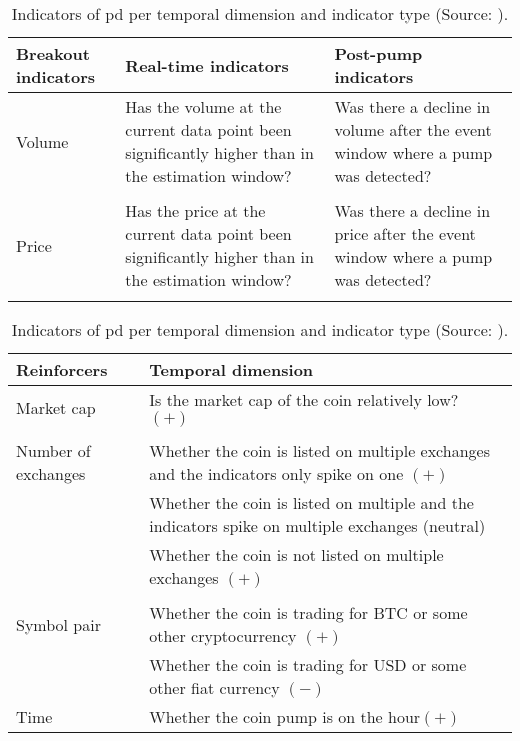 \begin{table}
    \centering
    \begin{tabular}{p{} p{} p{}}
    \hline
    \textbf{Breakout indicators} &\textbf{Real-time indicators} & \textbf{Post-pump indicators}\\
    \hline
    Volume & Has the volume at the current data point been significantly higher than in the estimation window? & Was there a decline in volume after the event window where a pump was detected?\\\\
    Price & Has the price at the current data point been significantly higher than in the estimation window? & Was there a decline in price after the event window where a pump was detected?\\\\
    \end{tabular}
    
    \begin{tabular}{p{} p{}}
    \hline
    \textbf{Reinforcers} &\textbf{Temporal dimension}\\
    \hline
    Market cap & Is the market cap of the coin relatively low? $(+)$\\\\
    Number of exchanges & Whether the coin is listed on multiple exchanges and the indicators only spike on one $(+)$\\
                        & Whether the coin is listed on multiple and the indicators spike on multiple exchanges (neutral)\\
                        & Whether the coin is not listed on multiple exchanges $(+)$\\\\
    Symbol pair         & Whether the coin is trading for BTC or some other cryptocurrency $(+)$\\
                        & Whether the coin is trading for USD or some other fiat currency $(-)$\\
    Time                & Whether the coin pump is on the hour$(+)$\\
    \hline
    \end{tabular}
    \caption[\acl{pd} indicators]{Indicators of \ac{pd} per temporal dimension and indicator type (Source: \cite{P&D_to_the_moon, P&D_anatomy}).}
    \label{tab:pd_indicators}
\end{table}